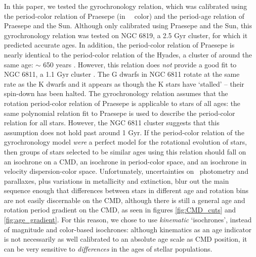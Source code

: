 
In this paper, we tested the \citet{angus2019} gyrochronology relation, which
was calibrated using the period-color relation of Praesepe (in \gaia\ \gcolor\
color) and the period-age relation of Praesepe and the Sun.
Although only calibrated using Praesepe and the Sun, this gyrochronology
relation was tested on NGC 6819, a 2.5 Gyr cluster, for which it predicted
accurate ages.
In addition, the period-color relation of Praesepe is nearly identical to the
period-color relation of the Hyades, a cluster of around the same age: $\sim$
650 years \citep{douglas2016, douglas2017, rebull2017}.
However, this relation does {\it not} provide a good fit to NGC 6811, a 1.1
Gyr cluster \citep{curtis2019}.
The G dwarfs in NGC 6811 rotate at the same rate as the K dwarfs and it
appears as though the K stars have `stalled' -- their spin-down has been
halted.
The \citet{angus2019} gyrochronology relation assumes that the rotation
period-color relation of Praesepe is applicable to stars of all ages: the same
polynomial relation fit to Praesepe is used to describe the period-color
relation for all stars.
However, the NGC 6811 cluster suggests that this assumption does not hold past
around 1 Gyr.
If the period-color relation of the \citet{angus2019} gyrochronology model
{\it were} a perfect model for the rotational evolution of stars, then groups
of stars selected to be similar ages using this relation should fall on an
isochrone on a CMD, an isochrone in period-color space, and an
isochrone in velocity dispersion-color space.
Unfortunately, uncertainties on \gaia\ photometry and parallaxes, plus
variations in metallicity and extinction, blur out the main sequence enough
that differences between stars in different age and rotation bins are not
easily discernable on the CMD, although there is still a general age and
rotation period gradient on the CMD, as seen in figures \ref{fig:CMD_cuts} and
\ref{fig:age_gradient}.
For this reason, we chose to use {\it kinematic} `isochrones', instead of
magnitude and color-based isochrones: although kinematics as an age indicator
is not necessarily as well calibrated to an absolute age scale as CMD
position, it can be very sensitive to {\it differences} in the ages of stellar
populations.

